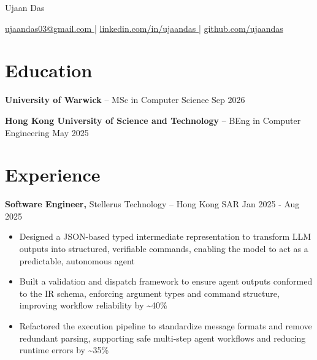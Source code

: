 \documentclass[11pt]{article}
\begin{document}
\centerline{\Huge Ujaan Das}
\vspace{5pt}
\centerline{
    \href{mailto:ujaandas03@gmail.com}{ ujaandas03@gmail.com } |
    \href{https://www.linkedin.com/in/ujaandas}{ linkedin.com/in/ujaandas } |
    \href{https://github.com/ujaandas}{ github.com/ujaandas }
}

\vspace{-18pt}


    \section*{ Education }
    
        
\textbf{University of Warwick} -- MSc in Computer Science \hfill Sep 2026

        \vspace{-5pt}
    
        
\textbf{Hong Kong University of Science and Technology} -- BEng in Computer Engineering \hfill May 2025

        \vspace{-5pt}
    
    \vspace{-18pt}

    \section*{ Experience }
    
        
\textbf{Software Engineer,} {\small Stellerus Technology} -- Hong Kong SAR \hfill Jan 2025 - Aug 2025 \\
\vspace{-9pt}
\begin{itemize}
    \item Designed a JSON-based typed intermediate representation to transform LLM outputs into structured, verifiable commands, enabling the model to act as a predictable, autonomous agent
    \item Built a validation and dispatch framework to ensure agent outputs conformed to the IR schema, enforcing argument types and command structure, improving workflow reliability by \textasciitilde40\%
    \item Refactored the execution pipeline to standardize message formats and remove redundant parsing, supporting safe multi-step agent workflows and reducing runtime errors by \textasciitilde35\%
\end{itemize}

        \vspace{-5pt}
    
\end{document}
